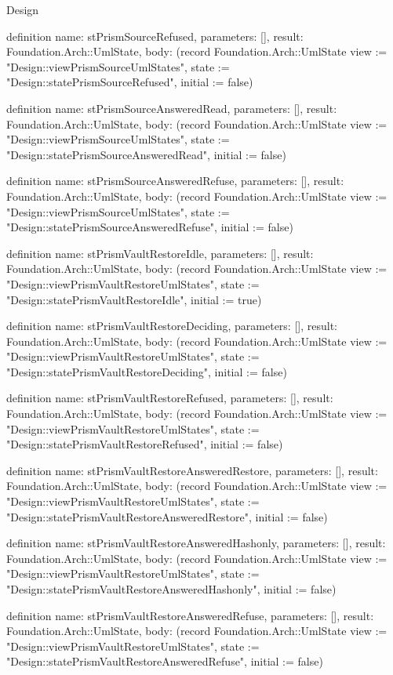\begin{lexlean}{Design}
\begin{semanticmodule}
definition{
  name: stPrismSourceRefused,
  parameters: [],
  result: Foundation.Arch::UmlState,
  body: (record Foundation.Arch::UmlState {view := "Design::viewPrismSourceUmlStates", state := "Design::statePrismSourceRefused", initial := false})
}

definition{
  name: stPrismSourceAnsweredRead,
  parameters: [],
  result: Foundation.Arch::UmlState,
  body: (record Foundation.Arch::UmlState {view := "Design::viewPrismSourceUmlStates", state := "Design::statePrismSourceAnsweredRead", initial := false})
}

definition{
  name: stPrismSourceAnsweredRefuse,
  parameters: [],
  result: Foundation.Arch::UmlState,
  body: (record Foundation.Arch::UmlState {view := "Design::viewPrismSourceUmlStates", state := "Design::statePrismSourceAnsweredRefuse", initial := false})
}

definition{
  name: stPrismVaultRestoreIdle,
  parameters: [],
  result: Foundation.Arch::UmlState,
  body: (record Foundation.Arch::UmlState {view := "Design::viewPrismVaultRestoreUmlStates", state := "Design::statePrismVaultRestoreIdle", initial := true})
}

definition{
  name: stPrismVaultRestoreDeciding,
  parameters: [],
  result: Foundation.Arch::UmlState,
  body: (record Foundation.Arch::UmlState {view := "Design::viewPrismVaultRestoreUmlStates", state := "Design::statePrismVaultRestoreDeciding", initial := false})
}

definition{
  name: stPrismVaultRestoreRefused,
  parameters: [],
  result: Foundation.Arch::UmlState,
  body: (record Foundation.Arch::UmlState {view := "Design::viewPrismVaultRestoreUmlStates", state := "Design::statePrismVaultRestoreRefused", initial := false})
}

definition{
  name: stPrismVaultRestoreAnsweredRestore,
  parameters: [],
  result: Foundation.Arch::UmlState,
  body: (record Foundation.Arch::UmlState {view := "Design::viewPrismVaultRestoreUmlStates", state := "Design::statePrismVaultRestoreAnsweredRestore", initial := false})
}

definition{
  name: stPrismVaultRestoreAnsweredHashonly,
  parameters: [],
  result: Foundation.Arch::UmlState,
  body: (record Foundation.Arch::UmlState {view := "Design::viewPrismVaultRestoreUmlStates", state := "Design::statePrismVaultRestoreAnsweredHashonly", initial := false})
}

definition{
  name: stPrismVaultRestoreAnsweredRefuse,
  parameters: [],
  result: Foundation.Arch::UmlState,
  body: (record Foundation.Arch::UmlState {view := "Design::viewPrismVaultRestoreUmlStates", state := "Design::statePrismVaultRestoreAnsweredRefuse", initial := false})
}


\end{semanticmodule}
\end{lexlean}
